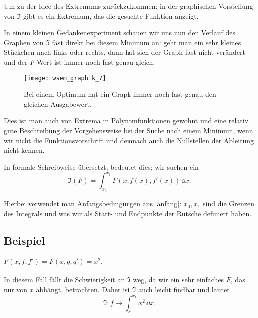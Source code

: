 Um zu der Idee des Extremums zurückzukommen: in der graphischen Vorstellung von $\mathfrak{I}$ gibt es ein Extremum, das die gesuchte Funktion anzeigt. 

In einem kleinen Gedankenexperiment schauen wir uns nun den Verlauf des Graphen von $\mathfrak{I}$ fast direkt bei diesem Minimum an: geht man ein sehr kleines Stückchen nach links oder rechts, dann hat sich der Graph fast nicht verändert und der $F$-Wert ist immer noch fast genau gleich. 

\begin{figure}[ht]
 \centering
 \texttt{[image: wsem\_graphik\_7]}
 \captionsetup{justification=centering}
 \caption[Lokale Optima. TikZ - eigene Arbeit.]{Bei einem Optimum hat ein Graph immer noch fast genau den gleichen Ausgabewert.}
 \label{fig:extrema_normal}
\end{figure}


Dies ist man auch von Extrema in Polynomfunktionen gewohnt und eine relativ gute Beschreibung der Vorgehensweise bei der Suche nach einem Minimum, wenn wir nicht die Funktionsvorschrift und demnach auch die Nullstellen der Ableitung nicht kennen.

In formale Schreibweise übersetzt, bedeutet dies: wir suchen ein
\begin{equation}
\mathfrak{I}(F)= \int_{x_0}^{x_1} F(x, f(x), f'(x) ) \,\dd x. 
\end{equation}

Hierbei verwendet man Anfangsbedingungen aus \ref{anfang}: $x_0,x_1$ sind die Grenzen des Integrals und was wir als Start- und Endpunkte der Rutsche definiert haben.

\subsection*{Beispiel}
\paragraph{$F(x,f,f')=F(x,q,q')=x^2.$}
In diesem Fall fällt die Schwierigkeit an $\mathfrak{I}$ weg, da wir ein sehr einfaches $F$, das nur von $x$ abhängt, betrachten. Daher ist $\mathfrak{I}$ auch leicht findbar und lautet
\begin{equation}
\mathfrak{I} \colon f \mapsto \int_{x_0}^{x_1} x^2 \,\dd x.
\end{equation}



